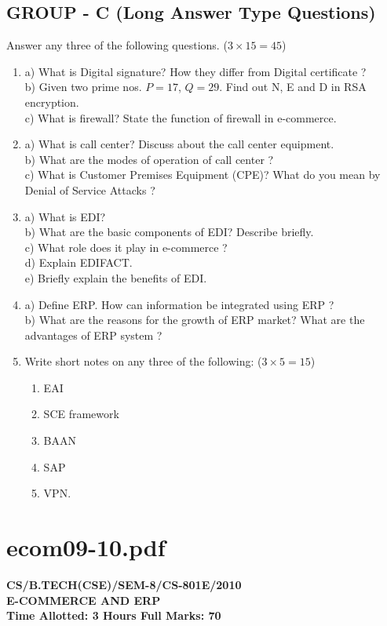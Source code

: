 \documentclass{article}
\begin{document}
\subsection*{GROUP - C (Long Answer Type Questions)}
Answer any three of the following questions. ($3 \times 15 = 45$)
\begin{enumerate}
    \item[7.] 
    a) What is Digital signature? How they differ from Digital certificate ? \\
    b) Given two prime nos. $P=17$, $Q=29$. Find out N, E and D in RSA encryption. \\
    c) What is firewall? State the function of firewall in e-commerce.
    \item[8.] 
    a) What is call center? Discuss about the call center equipment. \\
    b) What are the modes of operation of call center ? \\
    c) What is Customer Premises Equipment (CPE)? What do you mean by Denial of Service Attacks ?
    \item[9.] 
    a) What is EDI? \\
    b) What are the basic components of EDI? Describe briefly. \\
    c) What role does it play in e-commerce ? \\
    d) Explain EDIFACT. \\
    e) Briefly explain the benefits of EDI.
    \item[10.] 
    a) Define ERP. How can information be integrated using ERP ? \\
    b) What are the reasons for the growth of ERP market? What are the advantages of ERP system ?
    \item[11.] Write short notes on any three of the following: ($3 \times 5 = 15$)
    \begin{enumerate}
        \item[a)] EAI
        \item[b)] SCE framework
        \item[c)] BAAN
        \item[d)] SAP
        \item[e)] VPN.
    \end{enumerate}
\end{enumerate}

\newpage
\section*{ecom09-10.pdf}
\textbf{CS/B.TECH(CSE)/SEM-8/CS-801E/2010} \\
\textbf{E-COMMERCE AND ERP} \\
\textbf{Time Allotted: 3 Hours \hfill Full Marks: 70}
\end{document}
